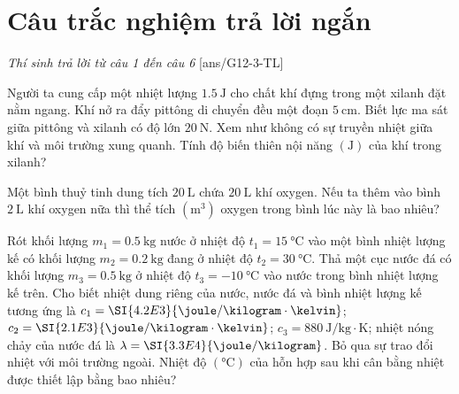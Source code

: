 \section{Câu trắc nghiệm trả lời ngắn} \textit{Thí sinh trả lời từ câu 1 đến câu 6}
\setcounter{ex}{0}
[ans/G12-3-TL]
\begin{ex}
Người ta cung cấp một nhiệt lượng $\SI{1.5}{\joule}$ cho chất khí đựng trong một xilanh đặt nằm ngang. Khí nở ra đẩy pittông di chuyển đều một đoạn $\SI{5}{\centi\meter}$. Biết lực ma sát giữa pittông và xilanh có độ lớn $\SI{20}{\newton}$. Xem như không có sự truyền nhiệt giữa khí và môi trường xung quanh. Tính độ biến thiên nội năng $\left(\si{\joule}\right)$ của khí trong xilanh?	
\end{ex}
\begin{ex}
	Một bình thuỷ tinh dung tích $\SI{20}{\liter}$ chứa $\SI{20}{\liter}$ khí oxygen. Nếu ta thêm vào bình $\SI{2}{\liter}$ khí oxygen nữa thì thể tích $\left(\si{\meter^3}\right)$ oxygen trong bình lúc này là bao nhiêu?
\end{ex}
\begin{ex}
	Rót khối lượng $m_{1}=\SI{0.5}{\kilogram}$ nước ở nhiệt độ $t_{1}=\SI{15}{\celsius}$ vào một bình nhiệt lượng kế có khối lượng $m_{2}=\SI{0.2}{\kilogram}$ đang ở nhiệt độ $t_{2}=\SI{30}{\celsius}$. Thả một cục nước đá có khối lượng $m_{3}=\SI{0.5}{\kilogram}$ ở nhiệt độ $t_{3}=\SI{-10}{\celsius}$ vào nước trong bình nhiệt lượng kế trên. Cho biết nhiệt dung riêng của nước, nước đá và bình nhiệt lượng kế tương ứng là $c_{1}=\SI{4.2E3}{\joule/\kilogram\cdot\kelvin}$; $c_{2}=\SI{2.1E3}{\joule/\kilogram\cdot\kelvin}$; $c_{3}=\SI{880}{\joule/\kilogram\cdot\kelvin}$; nhiệt nóng chảy của nước đá là $\lambda=\SI{3.3E4}{\joule/\kilogram}$. Bỏ qua sự trao đổi nhiệt với môi trường ngoài. Nhiệt độ $\left(\si{\celsius}\right)$ của hỗn hợp sau khi cân bằng nhiệt được thiết lập bằng bao nhiêu?
\end{ex}
